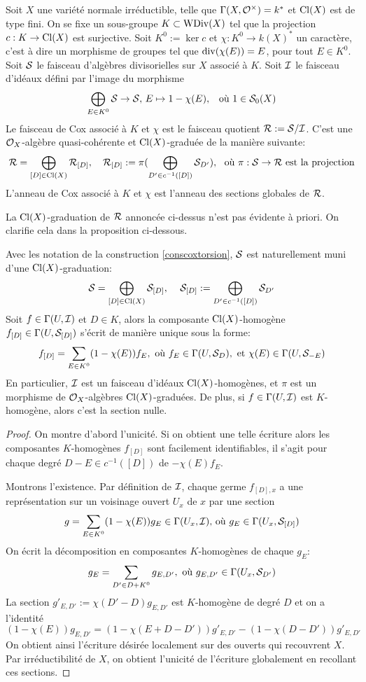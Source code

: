 \begin{cons}\label{conscoxtorsion}
Soit $X$ une variété normale irréductible, telle que $\Gamma(X,\mathcal{O}^\times)=k^*$ et $\operatorname{Cl}(X)$ est de type fini. On se fixe un sous-groupe $K\subset \operatorname{WDiv}(X)$ tel que la projection $c:K\rightarrow \operatorname{Cl}(X)$ est surjective. Soit $K^0:=\ker c$ et $\chi:K^0\rightarrow k(X)^*$ un caractère, c'est à dire un morphisme de groupes tel que $\operatorname{div}(\chi(E))=E$, pour tout $E\in K^0$. Soit $\mathcal{S}$ le faisceau d'algèbres divisorielles sur $X$ associé à $K$. Soit $\mathcal{I}$ le faisceau d'idéaux défini par l'image du morphisme 
$$\bigoplus_{E\in K^0}\mathcal{S}\rightarrow \mathcal{S},\, E\mapsto 1-\chi(E),\,\,\, \text{ où }1\in \mathcal{S}_0(X)$$
Le faisceau de Cox associé à $K$ et $\chi$ est le faisceau quotient $\mathcal{R}:=\mathcal{S}/\mathcal{I}$. C'est une $\mathcal{O}_X$-algèbre quasi-cohérente et $\operatorname{Cl}(X)$-graduée de la manière suivante: 
$$\mathcal{R}=\bigoplus_{[D]\in \operatorname{Cl}(X)}\mathcal{R}_{[D]},\,\,\,\,\,\, \mathcal{R}_{[D]}:=\pi(\bigoplus_{D'\in c^{-1}([D])}\mathcal{S}_{D'}),\,\,\,\, \text{où }\pi:\mathcal{S}\rightarrow \mathcal{R}\text{ est la projection}$$
L'anneau de Cox associé à $K$ et $\chi$ est l'anneau des sections globales de $\mathcal{R}$.
\end{cons}

La $\operatorname{Cl}(X)$-graduation de $\mathcal{R}$ annoncée ci-dessus n'est pas évidente à priori. On clarifie cela dans la proposition ci-dessous.

\begin{prop}\label{coxidealform}
Avec les notation de la construction \ref{conscoxtorsion}, $\mathcal{S}$ est naturellement muni d'une $\operatorname{Cl}(X)$-graduation:
$$\mathcal{S}=\bigoplus_{[D]\in\operatorname{Cl}(X)}\mathcal{S}_{[D]},\,\,\,\,\,\,\, \mathcal{S}_{[D]}:=\bigoplus_{D'\in c^{-1}([D])}\mathcal{S}_{D'}$$
Soit $f\in\Gamma(U,\mathcal{I})$ et $D\in K$, alors la composante $\operatorname{Cl}(X)$-homogène $f_{[D]}\in \Gamma(U,\mathcal{S}_{[D]})$ s'écrit de manière unique sous la forme:
$$f_{[D]}=\sum_{E\in K^0}(1-\chi(E))f_E, \text{  où } f_E\in\Gamma(U,\mathcal{S}_D), \text{ et }\chi(E)\in \Gamma(U, \mathcal{S}_{-E})$$
En particulier, $\mathcal{I}$ est un faisceau d'idéaux $\operatorname{Cl}(X)$-homogènes, et $\pi$ est un morphisme de $\mathcal{O}_X$-algèbres $\operatorname{Cl}(X)$-graduées. De plus, si $f\in \Gamma(U,\mathcal{I})$ est $K$-homogène, alors c'est la section nulle.
\end{prop}
\begin{proof}
On montre d'abord l'unicité. Si on obtient une telle écriture alors les composantes $K$-homogènes  $f_{[D]}$ sont facilement identifiables, il s'agit pour chaque degré $D-E\in c^{-1}([D])$ de $-\chi(E)f_E$.

Montrons l'existence. Par définition de $\mathcal{I}$, chaque germe $f_{[D],x}$ a une représentation sur un voisinage ouvert $U_x$ de $x$ par une section 
$$g=\sum_{E\in K^0}(1-\chi(E))g_E \in \Gamma(U_x, \mathcal{I})\text{, où }g_E\in \Gamma(U_x, \mathcal{S}_{[D]})$$
On écrit la décomposition en composantes $K$-homogènes de chaque $g_E$:
$$g_E=\sum_{D'\in D+K^0}g_{E,D'}, \text{ où } g_{E,D'}\in\Gamma(U_x, \mathcal{S}_{D'})$$
La section $g'_{E,D'}:=\chi(D'-D)g_{E,D'}$ est $K$-homogène de degré $D$ et on a l'identité 
$$(1-\chi(E))g_{E,D'}=(1-\chi(E+D-D'))g'_{E,D'}-(1-\chi(D-D'))g'_{E,D'}$$
On obtient ainsi l'écriture désirée localement sur des ouverts qui recouvrent $X$. Par irréductibilité de $X$, on obtient l'unicité de l'écriture globalement en recollant ces sections.
\end{proof}

